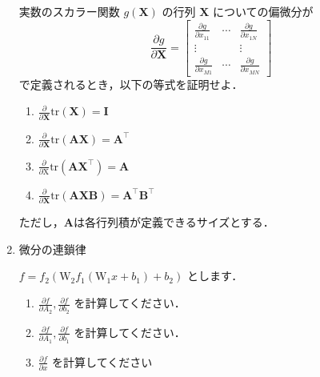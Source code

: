 \begin{enumerate}[label=問\arabic*.]
    \vspace{1mm}
    実数のスカラー関数 $g(\mathbf X)$ の行列 $\mathbf X$ についての偏微分が
    \begin{equation}
      \frac{\partial g}{\partial \mathbf X} =
      \begin{bmatrix}
        \displaystyle
        \frac{\partial g}{\partial x_{11}}&\cdots&\displaystyle \frac{\partial g}{\partial x_{1N}}\\
        \vdots& &\vdots\\
        \displaystyle \frac{\partial g}{\partial x_{M1}}&\cdots&\displaystyle \frac{\partial g}{\partial x_{MN}}
      \end{bmatrix}
    \end{equation}
    で定義されるとき，以下の等式を証明せよ．
    \begin{enumerate}[label=(\roman*)]
      \item $\frac{\partial}{\partial \mathbf{X}}{\mathrm{tr}}(\mathbf{X})={\mathbf{I}}$
      \item $\frac{\partial}{\partial \mathbf{X}}{\mathrm{tr}}({\mathbf{A}}{\mathbf{X}})={\mathbf{A}}^{\top}$
      \item $\frac{\partial}{\partial \mathrm{X}}{\mathrm{tr}}({\mathbf{A}}{\mathbf{X}}^{\top})={\mathbf{A}}$
      \item $\frac{\partial}{\partial \mathbf{X}}{\mathrm{tr}}({\mathbf{A}}{\mathbf{X}}{\mathbf{B}})={\mathbf{A}}^{\top}{\mathbf{B}}^{\top}$
    \end{enumerate}
    ただし，$\mathbf{A}$は各行列積が定義できるサイズとする．
  \item 微分の連鎖律

    \vspace{1mm}
    $f = f_2(\mathrm{W}_2 f_1(\mathrm{W}_1 x + b_1) + b_2)$ とします．
    \begin{enumerate}[label=(\roman*)]
      \item $\frac{\partial f}{\partial A_2}, \frac{\partial f}{\partial b_2}$ を計算してください．
      \item $\frac{\partial f}{\partial A_1}, \frac{\partial f}{\partial b_1}$ を計算してください．
      \item $\frac{\partial f}{\partial x}$ を計算してください
    \end{enumerate}

\end{enumerate}